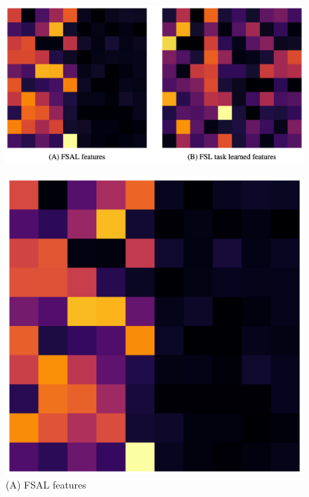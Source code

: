 \begin{figure}
    \iflatexml
        \includegraphics[width=6\linewidth]{figures/WA_abs_inferno.png}
    \else
    \begin{minipage}{0.48\linewidth}
    \centering
    \includegraphics[width=\linewidth]{figures/WA_abs_flexible_inferno.pdf}\\
    (A) FSAL features
    \end{minipage}\hfill%
    \begin{minipage}{0.48\linewidth}
    \centering

\end{minipage}
\end{figure}

